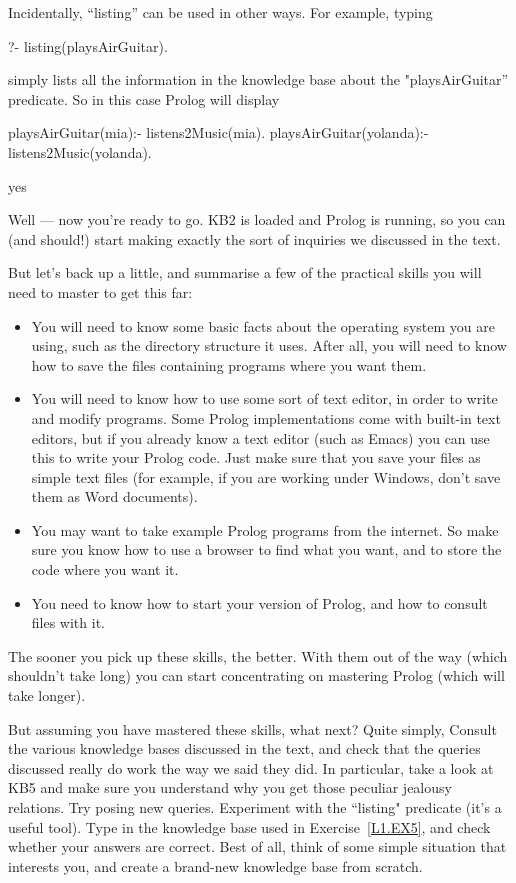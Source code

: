 Incidentally, ``listing'' can be used in other ways. For example, typing
%
\begin{LPNcodedisplay}
?- listing(playsAirGuitar).
\end{LPNcodedisplay}
%
simply lists all the information in the knowledge base about the
"playsAirGuitar'' predicate. So in this case Prolog will display
%
\begin{LPNcodedisplay}
playsAirGuitar(mia):-
   listens2Music(mia).
playsAirGuitar(yolanda):-
   listens2Music(yolanda).

yes
\end{LPNcodedisplay}



Well --- now you're ready to go. KB2 is loaded and Prolog is running,
so you can (and should!) start making exactly the sort of inquiries we
discussed in the text.

But let's back up a little, and summarise a few of the practical
skills you will need to master to get this far:

\begin{itemize}
\item{}You will need to know some basic facts about the operating
system you are using, such as the directory structure it uses. After
all, you will need to know how to save the files containing programs
where you want them.
\item{}You will need to know how to use some sort of text editor, in
order to write and modify programs. Some Prolog implementations come
with built-in text editors, but if you already know a text editor
(such as Emacs) you can use this to write your Prolog code. Just make
sure that you save your files as simple text files (for example, if you
are working under Windows, don't save them as Word documents).
\item{}You may want to take example Prolog programs from the internet.
So make sure you know how to use a browser to find what you want, and
to store the code where you want it.
\item{}You need to know how to start your version of Prolog, and how
to consult files with it.
\end{itemize}


The sooner you pick up these skills, the better. With them out of the
way (which shouldn't take long) you can start concentrating on
mastering Prolog (which will take longer).

But assuming you have mastered these skills, what next?  Quite simply,
 Consult the various knowledge bases
discussed in the text, and check that the queries discussed really do
work the way we said they did.  In particular, take a look at KB5 and
make sure you understand why you get those peculiar jealousy
relations.  Try posing new queries.  Experiment with the ``listing"
predicate (it's a useful tool).  Type in the knowledge base used in
Exercise~\ref{L1.EX5}, and check whether your answers are correct.
Best of all, think of some simple situation that interests you, and
create a brand-new knowledge base from scratch.

